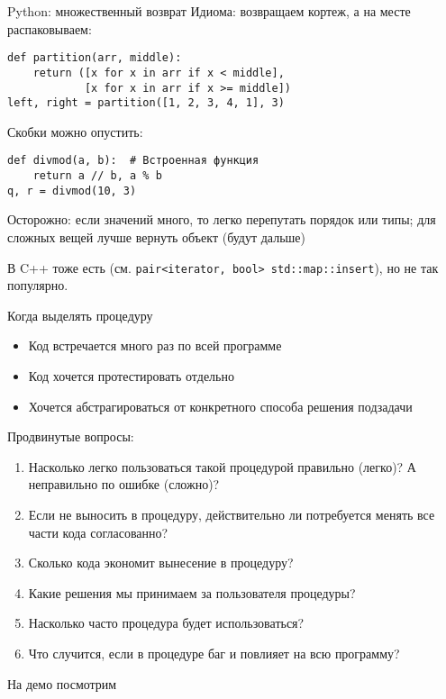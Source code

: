 \begin{frame}[t,fragile]{Python: множественный возврат}
	Идиома: возвращаем кортеж, а на месте распаковываем:
\begin{verbatim}
def partition(arr, middle):
    return ([x for x in arr if x < middle],
            [x for x in arr if x >= middle])
left, right = partition([1, 2, 3, 4, 1], 3)
\end{verbatim}

	Скобки можно опустить:
\begin{verbatim}
def divmod(a, b):  # Встроенная функция
    return a // b, a % b
q, r = divmod(10, 3)
\end{verbatim}

	Осторожно: если значений много, то легко перепутать порядок или типы;
	для сложных вещей лучше вернуть объект (будут дальше)

	В C++ тоже есть (см. \verb`pair<iterator, bool> std::map::insert`),
	но не так популярно.
\end{frame}

\begin{frame}{Когда выделять процедуру}
	\begin{itemize}
	\item Код встречается много раз по всей программе
	\item Код хочется протестировать отдельно
	\item Хочется абстрагироваться от конкретного способа решения подзадачи
	\end{itemize}
	
	Продвинутые вопросы:
	\begin{enumerate}
	\item
		Насколько легко пользоваться такой процедурой правильно (легко)?
		А неправильно по ошибке (сложно)?
	\item
		Если не выносить в процедуру, действительно ли потребуется
		менять все части кода согласованно?
	\item
		Сколько кода экономит вынесение в процедуру?
	\item
		Какие решения мы принимаем за пользователя процедуры?
	\item
		Насколько часто процедура будет использоваться?
	\item
		Что случится, если в процедуре баг и повлияет на всю программу?
	\end{enumerate}

	На демо посмотрим
\end{frame}

